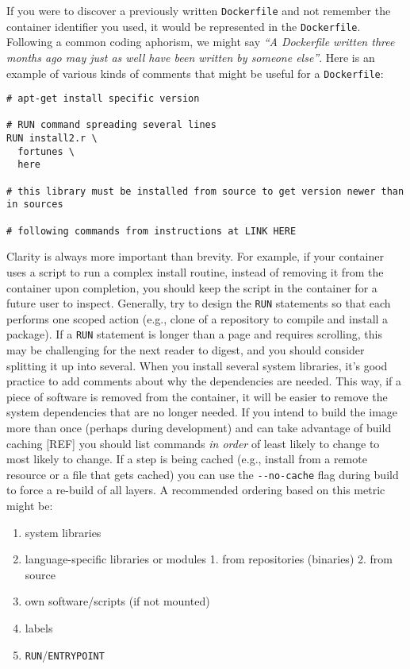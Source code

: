 \documentclass[10pt,letterpaper]{article}
\providecommand{\tightlist}{%
  \setlength{\itemsep}{0pt}\setlength{\parskip}{0pt}}
\begin{document}
If you were to discover a previously written \texttt{Dockerfile} and not
remember the container identifier you used, it would be represented in
the \texttt{Dockerfile}. Following a common coding aphorism, we might
say \emph{``A Dockerfile written three months ago may just as well have
been written by someone else''}. Here is an example of various kinds of
comments that might be useful for a \texttt{Dockerfile}:

\begin{verbatim}
# apt-get install specific version

# RUN command spreading several lines
RUN install2.r \
  fortunes \
  here

# this library must be installed from source to get version newer than in sources

# following commands from instructions at LINK HERE
\end{verbatim}

Clarity is always more important than brevity. For example, if your
container uses a script to run a complex install routine, instead of
removing it from the container upon completion, you should keep the
script in the container for a future user to inspect. Generally, try to
design the \texttt{RUN} statements so that each performs one scoped
action (e.g., clone of a repository to compile and install a package).
If a \texttt{RUN} statement is longer than a page and requires
scrolling, this may be challenging for the next reader to digest, and
you should consider splitting it up into several. When you install
several system libraries, it's good practice to add comments about why
the dependencies are needed. This way, if a piece of software is removed
from the container, it will be easier to remove the system dependencies
that are no longer needed. If you intend to build the image more than
once (perhaps during development) and can take advantage of build
caching {[}REF{]} you should list commands \emph{in order} of least
likely to change to most likely to change. If a step is being cached
(e.g., install from a remote resource or a file that gets cached) you
can use the \texttt{-\/-no-cache} flag during build to force a re-build
of all layers. A recommended ordering based on this metric might be:

\begin{enumerate}
\def\labelenumi{\arabic{enumi}.}
\tightlist
\item
  system libraries
\item
  language-specific libraries or modules 1. from repositories (binaries)
  2. from source
\item
  own software/scripts (if not mounted)
\item
  labels
\item
  \texttt{RUN}/\texttt{ENTRYPOINT}
\end{enumerate}
\end{document}

